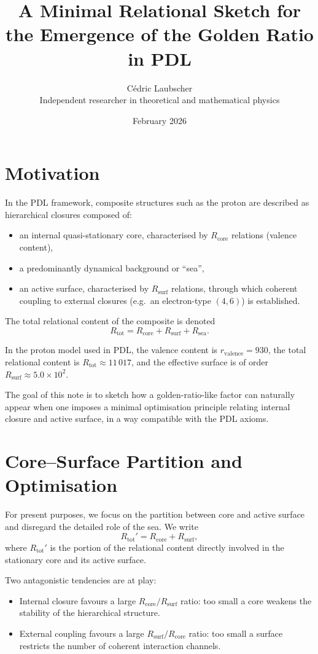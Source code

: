 \documentclass[11pt,a4paper]{article}
\title{A Minimal Relational Sketch for the Emergence of the Golden Ratio in PDL}
\author{C\'edric Laubscher\\
\small Independent researcher in theoretical and mathematical physics}
\date{February 2026}
\begin{document}
\maketitle

\section{Motivation}

In the PDL framework, composite structures such as the proton are described as hierarchical closures composed of:
\begin{itemize}
  \item an internal quasi-stationary core, characterised by $R_{\text{core}}$ relations (valence content),
  \item a predominantly dynamical background or ``sea'',
  \item an active surface, characterised by $R_{\text{surf}}$ relations, through which coherent coupling to external closures (e.g.\ an electron-type $(4,6)$) is established.
\end{itemize}

The total relational content of the composite is denoted
\[
R_{\text{tot}} = R_{\text{core}} + R_{\text{surf}} + R_{\text{sea}}.
\]

In the proton model used in PDL, the valence content is $r_{\text{valence}} = 930$, the total relational content is $R_{\text{tot}} \approx 11\,017$, and the effective surface is of order $R_{\text{surf}} \approx 5.0 \times 10^2$.

The goal of this note is to sketch how a golden-ratio-like factor can naturally appear when one imposes a minimal optimisation principle relating internal closure and active surface, in a way compatible with the PDL axioms.

\section{Core--Surface Partition and Optimisation}

For present purposes, we focus on the partition between core and active surface and disregard the detailed role of the sea. We write
\[
R_{\text{tot}}' = R_{\text{core}} + R_{\text{surf}},
\]
where $R_{\text{tot}}'$ is the portion of the relational content directly involved in the stationary core and its active surface.

Two antagonistic tendencies are at play:
\begin{itemize}
  \item Internal closure favours a large $R_{\text{core}}/R_{\text{surf}}$ ratio: too small a core weakens the stability of the hierarchical structure.
  \item External coupling favours a large $R_{\text{surf}}/R_{\text{core}}$ ratio: too small a surface restricts the number of coherent interaction channels.
\end{itemize}
\end{document}
